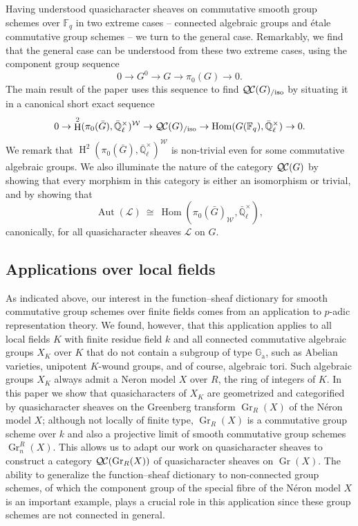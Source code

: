 \documentclass{amsart}
\theoremstyle{plain}
\theoremstyle{definition}
\theoremstyle{remark}
\newcommand{\FF}{{\mathbb{F}}}
\newcommand{\EE}{\mathbb{\bar Q}_\ell}
\newcommand{\Fq}{k}
\newcommand{\EEx}{\EE^\times}
\newcommand{\Weil}[1]{\mathcal{W}_{#1}}
\DeclareMathOperator{\Aut}{Aut}
\DeclareMathOperator{\Hom}{Hom}
\DeclareMathOperator{\Gr}{Gr}
\DeclareMathOperator{\Hh}{H}
\newcommand{\iso}{{\ \cong\ }}
\newcommand{\qcs}[1]{{\mathcal{#1}}}
\newcommand{\QC}{{\mathcal{Q\hskip-0.8pt C}}}
\newcommand{\QCiso}[1]{\QC(#1)_{/\text{iso}}}
\newcommand{\bG}{\bar{G}}
\begin{document}
Having understood quasicharacter sheaves on commutative smooth group schemes over $\FF_q$ in two extreme cases -- connected algebraic groups and étale commutative group schemes -- we turn to the general case. Remarkably, we find that the general case can be understood from these two extreme cases, using the component group sequence
\begin{equation}
0 \to G^0 \to G \to \pi_0(G) \to 0.
\end{equation}
The main result of the paper uses this sequence to find $\QCiso{G}$ by situating it in a canonical short exact sequence
\begin{equation}
0 \to \Hh^2(\pi_0(\bG),\EEx)^{\Weil{}} \to \QCiso{G} \to \Hom(G(\FF_q),\EEx) \to 0.
\end{equation}
We remark that $\Hh^2(\pi_0(\bG),\EEx)^{\Weil{}}$ is non-trivial even for some commutative algebraic groups.
We also illuminate the nature of the category $\QC(G)$ by showing that every morphism in this category is either an isomorphism or trivial, and by showing that 
\begin{equation}
\Aut(\qcs{L}) \iso \Hom(\pi_0(\bG)_{\Weil{}},\EEx),
\end{equation}
canonically, for all quasicharacter sheaves $\qcs{L}$ on $G$.

\subsection{Applications over local fields}

As indicated above, our interest in the function--sheaf dictionary for smooth commutative group schemes over finite fields comes from an application to $p$-adic representation theory. 
We found, however, that this application applies to all local fields $K$ with finite residue field $\Fq$ and all connected commutative algebraic groups $X_K$ over $K$ that do not contain a subgroup of type $\mathbb{G}_\text{a}$, such as Abelian varieties, unipotent $K$-wound groups, and of course, algebraic tori. 
Such algebraic groups $X_K$ always admit a Neron model $X$ over $R$, the ring of integers of $K$.
In this paper we show that quasicharacters of $X_K$ are geometrized and categorified by quasicharacter sheaves on the
Greenberg transform $\Gr_R(X)$ of the N\'eron model $X$; although not locally of finite type, $\Gr_R(X)$ is a commutative group scheme over $\Fq$ and also a projective limit of smooth commutative group schemes $\Gr^R_n(X)$.
This allows us to adapt our work on quasicharacter sheaves to construct a category $\QC(\Gr_R(X))$ of quasicharacter sheaves on $\Gr(X)$.
The ability to generalize the function--sheaf dictionary to non-connected group schemes, of which the component group of the special fibre of the Néron model $X$ is an important example, plays a crucial role in this application
since these group schemes are not connected in general.
\end{document}

